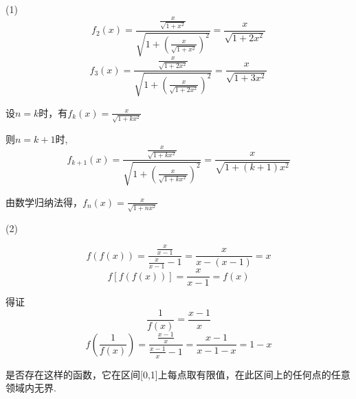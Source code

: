 \begin{solution}

    (1)
    \begin{equation*}
        f_2(x)=\frac{\frac{x}{\sqrt{1+x^2}}}{\sqrt{1+(\frac{x}{\sqrt{1+x^2}})^2}} = \frac{x}{\sqrt{1 + 2 x^2}}
    \end{equation*}
    \begin{equation*}
        f_3(x)=\frac{\frac{x}{\sqrt{1+2x^2}}}{\sqrt{1+(\frac{x}{\sqrt{1+2x^2}})^2}} = \frac{x}{\sqrt{1 + 3 x^2}}
    \end{equation*}

    设$n=k$时，有$f_k(x)=\frac{x}{\sqrt{1 + k x^2}}$

    则$n=k+1$时,\begin{equation*}
        f_{k+1}(x)=\frac{\frac{x}{\sqrt{1+kx^2}}}{\sqrt{1+(\frac{x}{\sqrt{1+kx^2}})^2}} = \frac{x}{\sqrt{1 + (k+1) x^2}}
    \end{equation*}

    由数学归纳法得，$f_n(x)=\frac{x}{\sqrt{1 + n x^2}}$

    (2)

    \begin{equation*}
        f(f(x)) = \frac{\frac{x}{x-1}}{\frac{x}{x-1}-1} = \frac{x}{x-(x-1)} = x
    \end{equation*}
    \begin{equation*}
        f[f(f(x))] = \frac{x}{x-1} = f(x)
    \end{equation*}

    得证
    \begin{equation*}
        \frac{1}{f(x)} = \frac{x-1}{x}
    \end{equation*}
    \begin{equation*}
        f(\frac{1}{f(x)}) = \frac{\frac{x-1}{x}}{\frac{x-1}{x}-1} = \frac{x-1}{x-1-x} = 1-x
    \end{equation*}
\end{solution}

\begin{exercise}
    是否存在这样的函数，它在区间[0,1]上每点取有限值，在此区间上的任何点的任意领域内无界.
\end{exercise}

